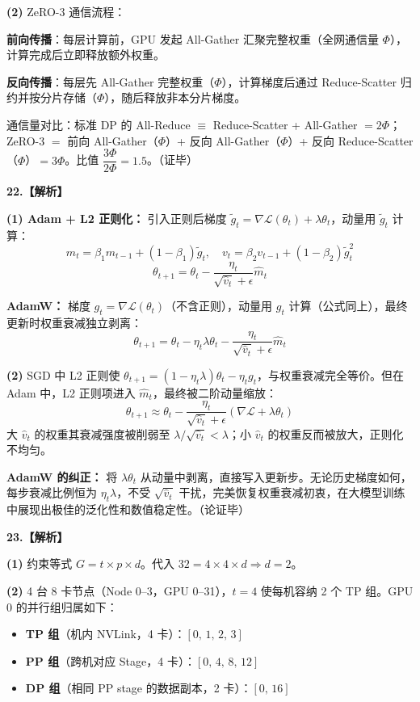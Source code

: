 \documentclass[a4paper]{ctexart}
\begin{document}
\vspace{0.4em}
\textbf{(2)} ZeRO-3 通信流程：

\textbf{前向传播}：每层计算前，GPU 发起 All-Gather 汇聚完整权重（全网通信量 $\Phi$），计算完成后立即释放额外权重。

\textbf{反向传播}：每层先 All-Gather 完整权重（$\Phi$），计算梯度后通过 Reduce-Scatter 归约并按分片存储（$\Phi$），随后释放非本分片梯度。

通信量对比：标准 DP 的 All-Reduce $\equiv$ Reduce-Scatter + All-Gather $=2\Phi$；ZeRO-3 $=$ 前向 All-Gather（$\Phi$）+ 反向 All-Gather（$\Phi$）+ 反向 Reduce-Scatter（$\Phi$）$=3\Phi$。比值 $\dfrac{3\Phi}{2\Phi}=\boxed{1.5}$。\quad（证毕）

\newpage

\noindent\textbf{22.【解析】}

\textbf{(1) Adam + L2 正则化：} 引入正则后梯度 $\tilde{g}_t=\nabla\mathcal{L}(\theta_t)+\lambda\theta_t$，动量用 $\tilde{g}_t$ 计算：
$$m_t=\beta_1 m_{t-1}+(1-\beta_1)\tilde{g}_t, \quad v_t=\beta_2 v_{t-1}+(1-\beta_2)\tilde{g}_t^2$$
$$\theta_{t+1}=\theta_t-\frac{\eta_t}{\sqrt{\hat{v}_t}+\epsilon}\hat{m}_t$$

\textbf{AdamW：} 梯度 $g_t=\nabla\mathcal{L}(\theta_t)$（不含正则），动量用 $g_t$ 计算（公式同上），最终更新时权重衰减独立剥离：
$$\theta_{t+1}=\theta_t-\eta_t\lambda\theta_t-\frac{\eta_t}{\sqrt{\hat{v}_t}+\epsilon}\hat{m}_t$$

\vspace{0.4em}
\textbf{(2)} SGD 中 L2 正则使 $\theta_{t+1}=(1-\eta_t\lambda)\theta_t-\eta_t g_t$，与权重衰减完全等价。但在 Adam 中，L2 正则项进入 $\hat{m}_t$，最终被二阶动量缩放：
$$\theta_{t+1}\approx\theta_t-\frac{\eta_t}{\sqrt{\hat{v}_t}+\epsilon}\!\left(\nabla\mathcal{L}+\lambda\theta_t\right)$$
大 $\hat{v}_t$ 的权重其衰减强度被削弱至 $\lambda/\sqrt{\hat{v}_t}<\lambda$；小 $\hat{v}_t$ 的权重反而被放大，正则化不均匀。

\textbf{AdamW 的纠正：} 将 $\lambda\theta_t$ 从动量中剥离，直接写入更新步。无论历史梯度如何，每步衰减比例恒为 $\eta_t\lambda$，不受 $\sqrt{\hat{v}_t}$ 干扰，完美恢复权重衰减初衷，在大模型训练中展现出极佳的泛化性和数值稳定性。\quad（论证毕）

\vspace{0.8em}

\noindent\textbf{23.【解析】}

\textbf{(1)} 约束等式 $G=t\times p\times d$。代入 $32=4\times4\times d\Rightarrow d=2$。

\vspace{0.4em}
\textbf{(2)} 4 台 8 卡节点（Node 0--3，GPU 0--31），$t=4$ 使每机容纳 2 个 TP 组。GPU 0 的并行组归属如下：
\begin{itemize}[nolistsep,leftmargin=2em,itemsep=0.25em]
    \item \textbf{TP 组}（机内 NVLink，4 卡）：$[0,\,1,\,2,\,3]$
    \item \textbf{PP 组}（跨机对应 Stage，4 卡）：$[0,\,4,\,8,\,12]$
    \item \textbf{DP 组}（相同 PP stage 的数据副本，2 卡）：$[0,\,16]$
\end{itemize}
\end{document}
